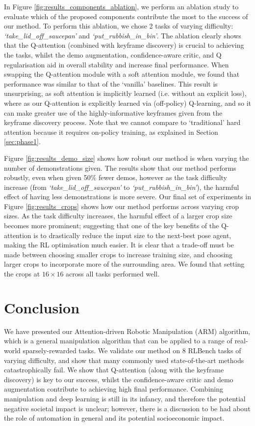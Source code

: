 \documentclass[letterpaper, 10 pt, journal, twoside]{IEEEtran}
\begin{document}
In Figure \ref{fig:results_components_ablation}, we perform an ablation study to evaluate which of the proposed components contribute the most to the success of our method. To perform this ablation, we chose 2 tasks of varying difficulty: \textit{`take\_lid\_off\_saucepan'} and \textit{`put\_rubbish\_in\_bin'}. The ablation clearly shows that the Q-attention (combined with keyframe discovery) is crucial to achieving the tasks, whilst the demo augmentation, confidence-aware critic, and Q regularisation aid in overall stability and increase final performance. When swapping the Q-attention module with a soft attention \cite{xu2015show} module, we found that performance was similar to that of the `vanilla' baselines. This result is unsurprising, as soft attention is implicitly learned (i.e. without an explicit loss), where as our Q-attention is explicitly learned via (off-policy) Q-learning, and so it can make greater use of the highly-informative keyframes given from the keyframe discovery process. Note that we cannot compare to `traditional' hard attention because it requires on-policy training, as explained in Section \ref{sec:phase1}.

Figure \ref{fig:results_demo_size} shows how robust our method is when varying the number of demonstrations given. The results show that our method performs robustly, even when given 50\% fewer demos, however as the task difficulty increase (from \textit{`take\_lid\_off\_saucepan'} to \textit{`put\_rubbish\_in\_bin'}), the harmful effect of having less demonstrations is more severe. Our final set of experiments in Figure \ref{fig:results_crops} shows how our method performs across varying crop sizes. As the task difficulty increases, the harmful effect of a larger crop size becomes more prominent; suggesting that one of the key benefits of the Q-attention is to drastically reduce the input size to the next-best pose agent, making the RL optimisation much easier. It is clear that a trade-off must be made between choosing smaller crops to increase training size, and choosing larger crops to incorporate more of the surrounding area. We found that setting the crops at $16 \times 16$ across all tasks performed well.

\section{Conclusion}

We have presented our Attention-driven Robotic Manipulation (ARM) algorithm, which is a general manipulation algorithm that can be applied to a range of real-world sparsely-rewarded tasks. We validate our method on 8 RLBench tasks of varying difficulty, and show that many commonly used state-of-the-art methods catastrophically fail. We show that Q-attention (along with the keyframe discovery) is key to our success, whilst the confidence-aware critic and demo augmentation contribute to achieving high final performance. Combining manipulation and deep learning is still in its infancy, and therefore the potential negative societal impact is unclear; however, there is a discussion to be had about the role of automation in general and its potential socioeconomic impact.
\end{document}
